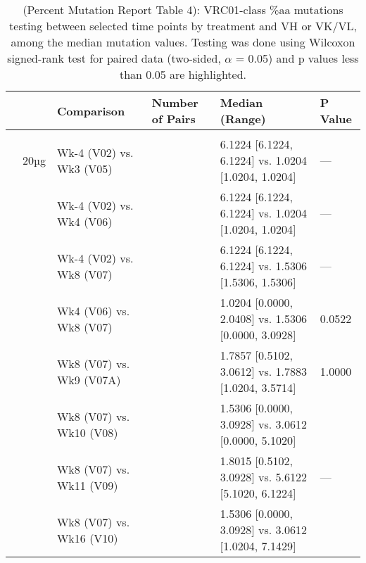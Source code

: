 \documentclass[
]{article}
\author{}
\date{\vspace{-2.5em}}
\begin{document}
\begin{table}[!h]

\caption[(Percent Mutation Report Table 4): VRC01-class \%aa mutations testing]{\label{tab:percent-mut-tab-04}(Percent Mutation Report Table 4): VRC01-class \%aa mutations testing between selected time points by treatment and VH or VK/VL, among the median mutation values. Testing was done using Wilcoxon signed-rank test for paired data (two-sided, $\alpha$ = 0.05) and p values less than 0.05 are highlighted.}
\centering
\fontsize{6.5}{8.5}\selectfont
\begin{tabular}[t]{ll>{\raggedright\arraybackslash}p{3.75cm}>{\raggedleft\arraybackslash}p{1cm}ll}
\toprule
 &  & Comparison & Number of Pairs & Median (Range) & P Value\\
\midrule
\addlinespace[0.3em]
\multicolumn{6}{l}{\textbf{VH}}\\
\hspace{1em} & 20µg & Wk-4 (V02) vs. Wk3 (V05) & 1 & 6.1224 [6.1224, 6.1224] vs. 1.0204 [1.0204, 1.0204] & ---\\
\cmidrule{3-6}
\hspace{1em} &  & Wk-4 (V02) vs. Wk4 (V06) & 1 & 6.1224 [6.1224, 6.1224] vs. 1.0204 [1.0204, 1.0204] & ---\\
\cmidrule{3-6}
\hspace{1em} &  & Wk-4 (V02) vs. Wk8 (V07) & 1 & 6.1224 [6.1224, 6.1224] vs. 1.5306 [1.5306, 1.5306] & ---\\
\cmidrule{3-6}
\hspace{1em} &  & Wk4 (V06) vs. Wk8 (V07) & 15 & 1.0204 [0.0000, 2.0408] vs. 1.5306 [0.0000, 3.0928] & 0.0522\\
\cmidrule{3-6}
\hspace{1em} &  & Wk8 (V07) vs. Wk9 (V07A) & 4 & 1.7857 [0.5102, 3.0612] vs. 1.7883 [1.0204, 3.5714] & 1.0000\\
\cmidrule{3-6}
\hspace{1em} &  & Wk8 (V07) vs. Wk10 (V08) & 15 & 1.5306 [0.0000, 3.0928] vs. 3.0612 [0.0000, 5.1020] & \cellcolor{yellow}{0.0012}\\
\cmidrule{3-6}
\hspace{1em} &  & Wk8 (V07) vs. Wk11 (V09) & 2 & 1.8015 [0.5102, 3.0928] vs. 5.6122 [5.1020, 6.1224] & ---\\
\cmidrule{3-6}
\hspace{1em} &  & Wk8 (V07) vs. Wk16 (V10) & 15 & 1.5306 [0.0000, 3.0928] vs. 3.0612 [1.0204, 7.1429] & \cellcolor{yellow}{0.0051}\\
\cmidrule{3-6}

\end{tabular}
\end{table}
\end{document}
